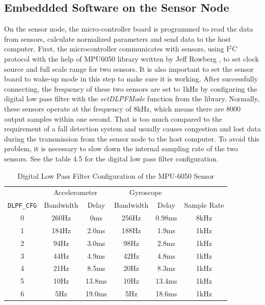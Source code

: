 \documentclass[letterpaper,12pt,titlepage,oneside,final]{book}
\begin{document}
\subsection{Embeddded Software on the Sensor Node}
On the sensor node, the micro-controller board is programmed to read the data from sensors, calculate normalized parameters and send data to the host computer. First, the microcontroller communicates with sensors, using I$^{2}$C protocol with the help of MPU6050 library written by Jeff Rowberg \cite{mpu_lib}, to set clock source and full scale range for two sensors. It is also important to set the sensor board to wake-up mode in this step to make sure it is working.  After successfully connecting, the frequency of these two sensors are set to 1kHz by configuring the digital low pass filter with the \textit{setDLPFMode} function from the library. Normally, these sensors operate at the frequency of 8kHz, which means there are 8000 output samples within one second. That is too much compared to the requirement of a fall detection system and usually causes congestion and lost data during the transmission from the sensor node to the host computer. To avoid this problem, it is necessary to slow down the internal sampling rate of the two sensors. See the table 4.5 for the digital low pass filter configuration. \clearpage
\begin{table}[h!]
	\begin{center}
		\begin{tabular}{ |c|c|c|c|c|c| } 
			\hline
			 & \multicolumn{2}{c|}{Accelerometer} & \multicolumn{2}{c|}{Gyroscope} &  \\
			 \cline{2-5}
			 \verb|DLPF_CFG| & Bandwidth & Delay & Bandwidth & Delay & Sample Rate\\ 
			 \hline
			 0 & 260Hz & 0ms & 256Hz & 0.98ms &8kHz \\
			 \hline
			 1 & 184Hz & 2.0ms & 188Hz & 1.9ms & 1kHz\\
			 \hline
			 2 & 94Hz & 3.0ms & 98Hz & 2.8ms & 1kHz\\
			 \hline
			 3 & 44Hz & 4.9ms & 42Hz & 4.8ms & 1kHz\\
			 \hline
			 4 & 21Hz & 8.5ms & 20Hz & 8.3ms & 1kHz\\
			 \hline
			 5 & 10Hz & 13.8ms & 10Hz & 13.4ms & 1kHz\\
			 \hline
			 6 & 5Hz & 19.0ms & 5Hz & 18.6ms & 1kHz\\
			 \hline
		\end{tabular}
		\caption{Digital Low Pass Filter Configuration of the MPU-6050 Sensor}
	\end{center}
\end{table}
\end{document}
